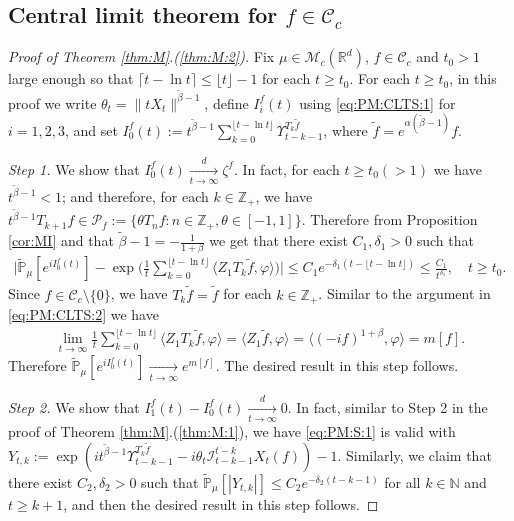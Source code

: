 \documentclass[12pt,a4paper]{amsart}
\theoremstyle{plain}
\theoremstyle{definition}
\numberwithin{equation}{section}
\begin{document}
\subsection{Central limit theorem for $f \in \mathcal C_c$}
\begin{proof}[Proof of Theorem \ref{thm:M}.(\ref{thm:M:2})]
  Fix $\mu\in \mathcal M_c(\mathbb R^d)$, $f\in \mathcal C_c$ and $t_0 > 1$ large enough so that $ \lceil t - \ln t\rceil \leq \lfloor t \rfloor - 1$ for each $t\geq t_0$.
  For each $t\geq t_0$, in this proof we write $\theta_t = \|t X_t\|^{\tilde \beta - 1}$,  define $I_i^f(t)$ using \eqref{eq:PM:CLTS:1}  for $i = 1,2,3$, and set $ I^f_0(t) := t^{\tilde \beta - 1}\sum_{k=0}^{\lfloor t-\ln t \rfloor} \Upsilon_{t-k-1}^{T_{k} \tilde f}$, where $\tilde f = e^{\alpha(\tilde \beta - 1)} f$.

  \emph{Step 1.} We show that $I^f_0(t) \xrightarrow[t\to \infty]{d} \zeta^f$.
  In fact, for each $t \geq  t_0( > 1)$ we have $t^{\tilde \beta - 1} < 1$; and therefore, for each $k \in \mathbb Z_+$, we have $t^{\tilde \beta - 1} T_{k+1} f \in \mathcal P_f:=\{\theta T_n f: n \in \mathbb Z_+, \theta \in [-1,1]\}$.
  Therefore from Proposition \ref{cor:MI} and that $\tilde \beta - 1 = -\frac{1}{1+\beta}$ we get that there exist $C_1,\delta_1 > 0$ such that
  \begin{align}
    \Big|\mathbb{\widetilde{P}}_{\mu} [e^{i I^f_0(t)} ]-\exp\Big(\frac{1}{t}\sum_{k=0}^{\lfloor t-\ln t \rfloor} \langle Z_1T_{k}\tilde f, \varphi\rangle \Big)\Big|
    \leq C_1 e^{-\delta_1(t - \lfloor t - \ln t\rfloor)}
    \leq \frac{C_1}{t^{\delta_1}},
    \quad t\geq t_0.
  \end{align}
  Since $f \in \mathcal C_c\setminus \{0\}$, we have $T_k \tilde f = \tilde f$ for each $k \in \mathbb Z_+$.
  Similar to the argument in \eqref{eq:PM:CLTS:2} we have
  \begin{align}
    \label{CLT:C:eq:m}
    \lim_{t\to \infty} \frac{1}{t}\sum_{k=0}^{\lfloor t-\ln t \rfloor} \langle Z_1 T_{k}\tilde f, \varphi\rangle
    = \langle Z_1 \tilde f,\varphi \rangle
    = \langle (-if)^{1+\beta}, \varphi \rangle
    = m[f].
  \end{align}
  Therefore $\mathbb {\widetilde P}_\mu[e^{i I^f_0(t)}] \xrightarrow[t\to \infty]{} e^{m[f]}$.
  The desired result in this step follows.

  \emph{Step 2.} We show that $ I^f_1(t) - I^f_0 (t) \xrightarrow[t\to \infty]{d} 0$.
  In fact, similar to Step 2 in the proof of Theorem \ref{thm:M}.(\ref{thm:M:1}), we  have \eqref{eq:PM:S:1} is valid with $ Y_{t,k} := \exp(i t^{\tilde \beta - 1} \Upsilon_{t-k-1}^{T_{k}\tilde f} - i\theta_t \mathcal I_{t-k-1}^{t-k} X_t(f)) - 1$.
  Similarly, we claim that there exist $C_2, \delta_2>0$ such that $\widetilde {\mathbb P}_\mu [|Y_{t,k}|] \leq C_2 e^{-\delta_2 (t-k-1)}$ for all $k\in \mathbb N$ and $t\geq k+1$, and  then the desired result in this step follows.


\end{proof}
\end{document}
